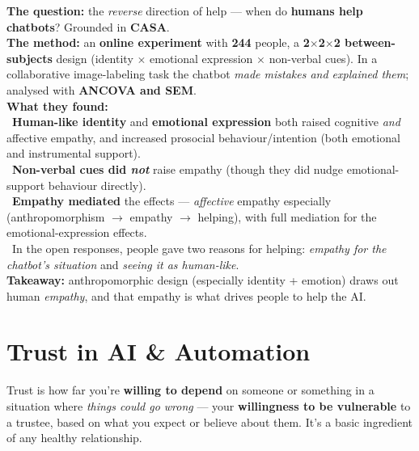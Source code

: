 \documentclass[11pt, oneside]{book}
\begin{document}
\begin{thmbox}[title={Paper 3 — what you need to remember}]
\textbf{The question:} the \emph{reverse} direction of help — when do
\textbf{humans help chatbots}? Grounded in \textbf{CASA}.\\
\textbf{The method:} an \textbf{online experiment} with \textbf{244} people, a
\textbf{2$\times$2$\times$2 between-subjects} design (identity $\times$
emotional expression $\times$ non-verbal cues). In a collaborative
image-labeling task the chatbot \emph{made mistakes and explained them};
analysed with \textbf{ANCOVA and SEM}.\\
\textbf{What they found:}\\
\textbullet\ \textbf{Human-like identity} and \textbf{emotional expression}
both raised cognitive \emph{and} affective empathy, and increased prosocial
behaviour/intention (both emotional and instrumental support).\\
\textbullet\ \textbf{Non-verbal cues did \emph{not}} raise empathy (though they
did nudge emotional-support behaviour directly).\\
\textbullet\ \textbf{Empathy mediated} the effects — \emph{affective} empathy
especially (anthropomorphism $\to$ empathy $\to$ helping), with full mediation
for the emotional-expression effects.\\
\textbullet\ In the open responses, people gave two reasons for helping:
\emph{empathy for the chatbot's situation} and \emph{seeing it as
human-like}.\\
\textbf{Takeaway:} anthropomorphic design (especially identity + emotion) draws
out human \emph{empathy}, and that empathy is what drives people to help the
AI.
\end{thmbox}


\chapter{Trust in AI \& Automation}

\begin{defbox}[title={Trust}]
Trust is how far you're \textbf{willing to depend} on someone or something in a
situation where \emph{things could go wrong} — your \textbf{willingness to be
vulnerable} to a trustee, based on what you expect or believe about them. It's
a basic ingredient of any healthy relationship.
\end{defbox}
\end{document}
